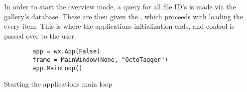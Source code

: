 In order to start the overview mode, a query for all file ID's is made via the
gallery's database. These are then given the , which proceeds
with loading the every item. This is where the applications initialization
ends, and control is passed over to the user.

\begin{listing}[p]
	\begin{verbatim}
		app = wx.App(False)
		frame = MainWindow(None, "OctoTagger")
		app.MainLoop()
	\end{verbatim}
	\caption{Starting the applications main loop}
	\label{lst:mod:mainloop}
\end{listing}
